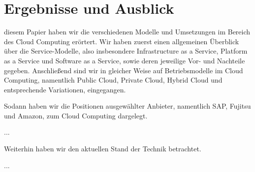 \section{Ergebnisse und Ausblick}
\label{sec_conclusion}

 diesem Papier haben wir die verschiedenen Modelle und Umsetzungen im Bereich des Cloud Computing erörtert. 
Wir haben zuerst einen allgemeinen Überblick über die Service-Modelle, also insbesondere Infrastructure as a Service, Platform as a Service und Software as a Service, sowie deren jeweilige Vor- und Nachteile gegeben. 
Anschließend sind wir in gleicher Weise auf Betriebsmodelle im Cloud Computing, namentlich Public Cloud, Private Cloud, Hybrid Cloud und entsprechende Variationen, eingegangen. 

Sodann haben wir die Positionen ausgewählter Anbieter, namentlich SAP, Fujitsu und Amazon, zum Cloud Computing dargelegt.

...

Weiterhin haben wir den aktuellen Stand der Technik betrachtet.

...


